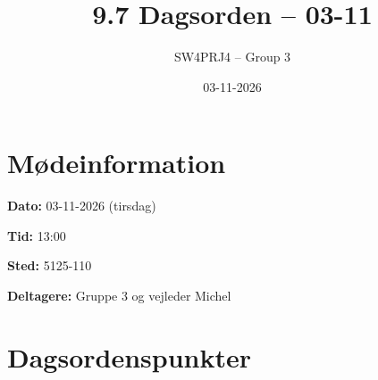 \documentclass[a4paper,11pt]{article}
\title{9.7 Dagsorden -- 03-11}
\author{SW4PRJ4 -- Group 3}
\date{03-11-2026}
\begin{document}
\maketitle

\section*{Mødeinformation}

\textbf{Dato:} 03-11-2026 (tirsdag)

\textbf{Tid:} 13:00

\textbf{Sted:} 5125-110

\textbf{Deltagere:} Gruppe 3 og vejleder Michel

\section*{Dagsordenspunkter}
\end{document}
